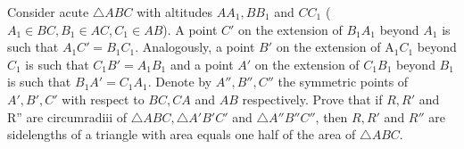 Consider acute $\triangle ABC$ with altitudes $AA_1, BB_1$ and $CC_1$ ($A_1 \in BC,B_1 \in  AC,C_1 \in  AB$). A point $C' $ on the extension of $B_1A_1$ beyond $A_1$ is such that $A_1C' = B_1C_1$. Analogously, a point $B'$ on the extension of A$_1C_1$ beyond $C_1$ is such that $C_1B'  = A_1B_1$ and a point $A' $ on the extension of $C_1B_1$ beyond $B_1$ is such that $B_1A'  = C_1A_1$. Denote by $A'', B'', C''$ the symmetric points of $A' , B' , C'$  with respect to $BC, CA$ and $AB$ respectively. Prove that if $R, R'$  and R'' are circumradiii of $\triangle ABC, \triangle A'B'C'$ and $\triangle A''B''C''$, then $R, R'$  and $R'' $ are sidelengths of a triangle with area equals one half of the area of $\triangle ABC$.